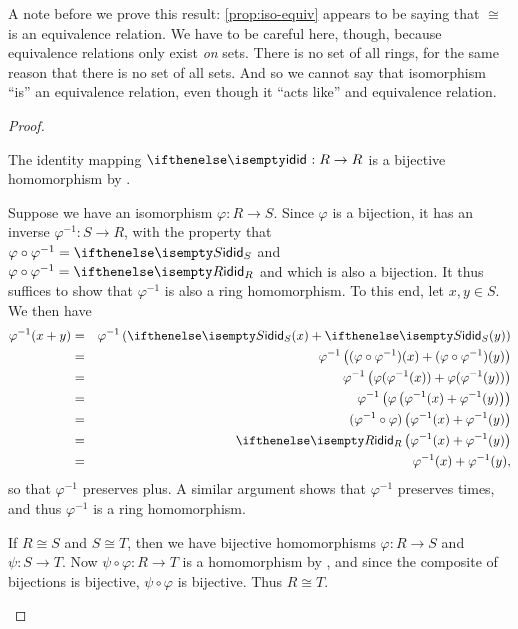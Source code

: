 A note before we prove this result: \ref{prop:iso-equiv} appears to be saying that \(\cong\) is an equivalence relation. We have to be careful here, though, because equivalence relations only exist \emph{on} sets. There is no set of all rings, for the same reason that there is no set of all sets. And so we cannot say that isomorphism ``is'' an equivalence relation, even though it ``acts like'' and equivalence relation.

\begin{proof}
\begin{inlineproplist}
\item The identity mapping \(\ID : R \rightarrow R\) is a bijective homomorphism by .
\item Suppose we have an isomorphism \(\varphi : R \rightarrow S\). Since \(\varphi\) is a bijection, it has an inverse \(\varphi^{-1} : S \rightarrow R\), with the property that \(\varphi \circ \varphi^{-1} = \ID[S]\) and \(\varphi \circ \varphi^{-1} = \ID[R]\) and which is also a bijection. It thus suffices to show that \(\varphi^{-1}\) is also a ring homomorphism. To this end, let \(x,y \in S\). We then have
\begin{eqnarray*}
\varphi^{-1}(x + y) & = & \varphi^{-1}\left(\ID[S](x) + \ID[S](y)\right) \\
 & = & \varphi^{-1}\left( (\varphi \circ \varphi^{-1})(x) + (\varphi \circ \varphi^{-1})(y) \right) \\
 & = & \varphi^{-1}\left( \varphi(\varphi^{-1}(x)) + \varphi(\varphi^{-1}(y)) \right) \\
 & = & \varphi^{-1}\left( \varphi\left( \varphi^{-1}(x) + \varphi^{-1}(y) \right) \right) \\
 & = & (\varphi^{-1} \circ \varphi)\left( \varphi^{-1}(x) + \varphi^{-1}(y) \right) \\
 & = & \ID[R]\left( \varphi^{-1}(x) + \varphi^{-1}(y) \right) \\
 & = & \varphi^{-1}(x) + \varphi^{-1}(y),
\end{eqnarray*}
so that \(\varphi^{-1}\) preserves plus. A similar argument shows that \(\varphi^{-1}\) preserves times, and thus \(\varphi^{-1}\) is a ring homomorphism.
\item If \(R \cong S\) and \(S \cong T\), then we have bijective homomorphisms \(\varphi : R \rightarrow S\) and \(\psi : S \rightarrow T\). Now \(\psi \circ \varphi : R \rightarrow T\) is a homomorphism by , and since the composite of bijections is bijective, \(\psi \circ \varphi\) is bijective. Thus \(R \cong T\).
\end{inlineproplist}
\end{proof}

